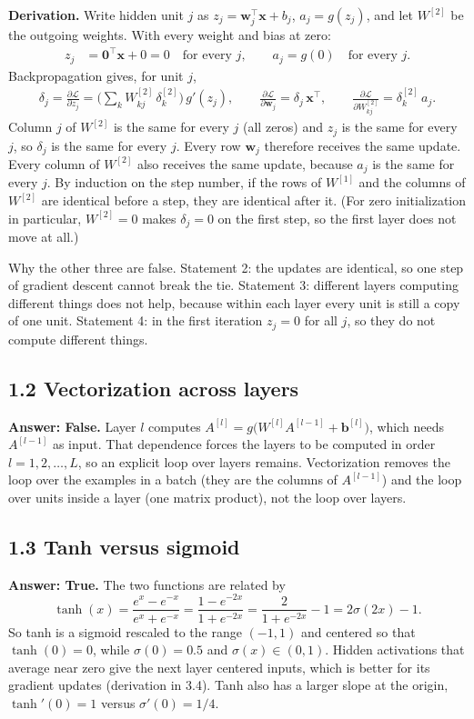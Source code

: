 \documentclass[11pt]{article}
\begin{document}
\textbf{Derivation.} Write hidden unit $j$ as $z_j = \mathbf{w}_j^\top \mathbf{x} + b_j$, $a_j = g(z_j)$, and let $W^{[2]}$ be the outgoing weights. With every weight and bias at zero:
\begin{align*}
z_j &= \mathbf{0}^\top\mathbf{x} + 0 = 0 \quad\text{for every } j, \qquad a_j = g(0) \quad\text{for every } j.
\end{align*}
Backpropagation gives, for unit $j$,
\begin{align*}
\delta_j = \frac{\partial \mathcal{L}}{\partial z_j} = \Big(\sum_k W^{[2]}_{kj}\,\delta^{[2]}_k\Big)\, g'(z_j),
\qquad
\frac{\partial \mathcal{L}}{\partial \mathbf{w}_j} = \delta_j\,\mathbf{x}^\top,
\qquad
\frac{\partial \mathcal{L}}{\partial W^{[2]}_{kj}} = \delta^{[2]}_k\, a_j .
\end{align*}
Column $j$ of $W^{[2]}$ is the same for every $j$ (all zeros) and $z_j$ is the same for every $j$, so $\delta_j$ is the same for every $j$. Every row $\mathbf{w}_j$ therefore receives the same update. Every column of $W^{[2]}$ also receives the same update, because $a_j$ is the same for every $j$. By induction on the step number, if the rows of $W^{[1]}$ and the columns of $W^{[2]}$ are identical before a step, they are identical after it. (For zero initialization in particular, $W^{[2]}=0$ makes $\delta_j = 0$ on the first step, so the first layer does not move at all.)

Why the other three are false. Statement 2: the updates are identical, so one step of gradient descent cannot break the tie. Statement 3: different layers computing different things does not help, because within each layer every unit is still a copy of one unit. Statement 4: in the first iteration $z_j = 0$ for all $j$, so they do not compute different things.

\subsection*{1.2 Vectorization across layers}
\textbf{Answer: False.} Layer $l$ computes $A^{[l]} = g\big(W^{[l]}A^{[l-1]} + \mathbf{b}^{[l]}\big)$, which needs $A^{[l-1]}$ as input. That dependence forces the layers to be computed in order $l = 1, 2, \dots, L$, so an explicit loop over layers remains. Vectorization removes the loop over the examples in a batch (they are the columns of $A^{[l-1]}$) and the loop over units inside a layer (one matrix product), not the loop over layers.

\subsection*{1.3 Tanh versus sigmoid}
\textbf{Answer: True.} The two functions are related by
\[
\tanh(x) = \frac{e^{x}-e^{-x}}{e^{x}+e^{-x}} = \frac{1-e^{-2x}}{1+e^{-2x}} = \frac{2}{1+e^{-2x}} - 1 = 2\sigma(2x) - 1 .
\]
So tanh is a sigmoid rescaled to the range $(-1,1)$ and centered so that $\tanh(0)=0$, while $\sigma(0)=0.5$ and $\sigma(x)\in(0,1)$. Hidden activations that average near zero give the next layer centered inputs, which is better for its gradient updates (derivation in 3.4). Tanh also has a larger slope at the origin, $\tanh'(0)=1$ versus $\sigma'(0)=1/4$.
\end{document}
